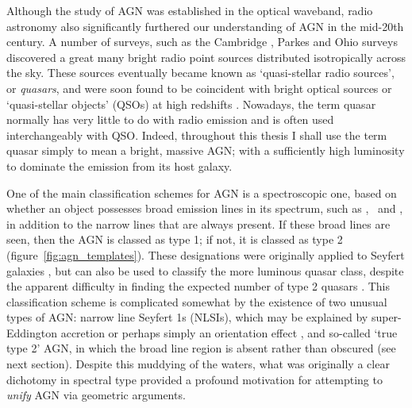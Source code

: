 Although the study of AGN was established in the optical waveband, 
radio astronomy also significantly furthered our understanding of AGN
in the mid-20th century. A number of surveys, such as the Cambridge \citep{edge1959}, 
Parkes \citep{ekers1969} and Ohio \citep{ehman1970} surveys discovered a great many 
bright radio point sources distributed isotropically across the sky.
These sources eventually became known as `quasi-stellar radio sources',
or {\em quasars}, and were soon found to be coincident with bright optical
sources or `quasi-stellar objects' (QSOs) at high 
redshifts \citep{schmidt1963,schmidt1965a,schmidt1965b}.
Nowadays, the term quasar normally has very little to do with 
radio emission and is often used interchangeably with QSO. 
Indeed, throughout this thesis I shall use the term quasar simply to mean a bright, 
massive AGN; with a sufficiently high luminosity to dominate the emission 
from its host galaxy.

One of the main classification schemes for AGN is a spectroscopic one, based on 
whether an object possesses broad emission lines in its spectrum, 
such as \civ, \hb\ and
\la, in addition to the narrow lines that are always present. 
If these broad lines are seen, then the AGN is classed as type 1;
if not, it is classed as type 2 (figure~\ref{fig:agn_templates}).
These designations were originally applied to Seyfert galaxies \citep{seyfert1943}, 
but can also be used to classify the more luminous quasar class, despite the apparent
difficulty in finding the expected number of type 2 quasars \citep{zakamska2003}. 
This classification scheme is complicated somewhat by the existence of two
unusual types of AGN: narrow line Seyfert 1s (NLSIs), which
may be explained by super-Eddington accretion \citep{done2015} 
or perhaps simply an orientation effect \citep{baldi2016},
and so-called `true type 2' AGN, in which the broad line region is absent 
\citep{tran2001,shi2010} rather than obscured (see next section).
Despite this muddying of the waters, what was originally a 
clear dichotomy in spectral type provided a 
profound motivation for attempting to {\em unify} AGN via geometric arguments.




